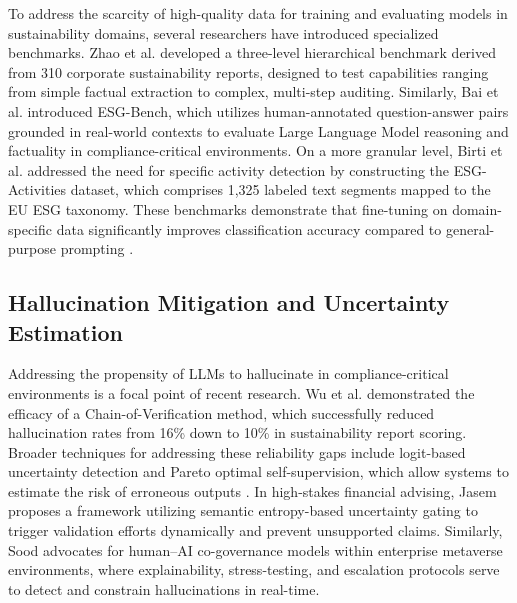 \documentclass[english, online, cse, master]{dithesis}
\begin{document}
To address the scarcity of high-quality data for training and evaluating models in sustainability domains, several researchers have introduced specialized benchmarks. Zhao et al.  \parencite{yilei_zhao_b7bbd9c8} developed a three-level hierarchical benchmark derived from 310 corporate sustainability reports, designed to test capabilities ranging from simple factual extraction to complex, multi-step auditing. Similarly, Bai et al.  \parencite{association_for_artificial_intelligence_2026_86e12eae} introduced ESG-Bench, which utilizes human-annotated question-answer pairs grounded in real-world contexts to evaluate Large Language Model reasoning and factuality in compliance-critical environments. On a more granular level, Birti et al.  \parencite{mattia_birti_c097e3e8} addressed the need for specific activity detection by constructing the ESG-Activities dataset, which comprises 1,325 labeled text segments mapped to the EU ESG taxonomy. These benchmarks demonstrate that fine-tuning on domain-specific data significantly improves classification accuracy compared to general-purpose prompting  \parencite{mattia_birti_c097e3e8}.
\subsection{Hallucination Mitigation and Uncertainty Estimation}

Addressing the propensity of LLMs to hallucinate in compliance-critical environments is a focal point of recent research. Wu et al.  \parencite{yue_wu_cae353aa} demonstrated the efficacy of a Chain-of-Verification method, which successfully reduced hallucination rates from 16\% down to 10\% in sustainability report scoring. Broader techniques for addressing these reliability gaps include logit-based uncertainty detection and Pareto optimal self-supervision, which allow systems to estimate the risk of erroneous outputs  \parencite{yue_zhang_9101e661}. In high-stakes financial advising, Jasem  \parencite{al_noor_ali_aziz_jasem_af362154} proposes a framework utilizing semantic entropy-based uncertainty gating to trigger validation efforts dynamically and prevent unsupported claims. Similarly, Sood  \parencite{rohit_sood_cb3a4ead} advocates for human–AI co-governance models within enterprise metaverse environments, where explainability, stress-testing, and escalation protocols serve to detect and constrain hallucinations in real-time.
\end{document}
